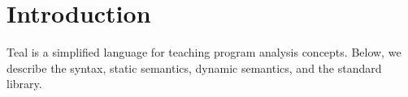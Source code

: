 

\section{Introduction}

Teal is a simplified language for teaching program analysis concepts.
Below, we describe the syntax, static semantics, dynamic semantics,
and the standard library.








